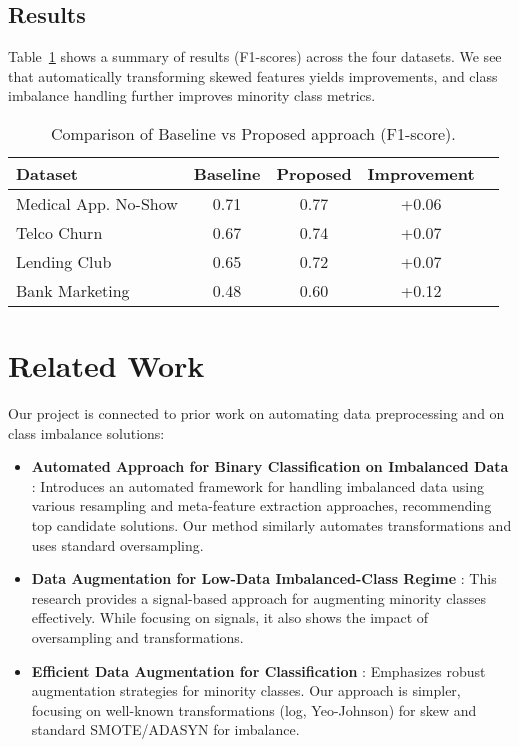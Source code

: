 \documentclass[11pt]{article}
\begin{document}
\subsection{Results}
Table~\ref{tab:results} shows a summary of results (F1-scores) across the four datasets. We see that automatically transforming skewed features yields improvements, and class imbalance handling further improves minority class metrics.

\begin{table}[H]
\centering
\caption{Comparison of Baseline vs Proposed approach (F1-score).}
\label{tab:results}
\begin{tabular}{lcccc}
\toprule
\textbf{Dataset} & \textbf{Baseline} & \textbf{Proposed} & \textbf{Improvement}\\
\midrule
Medical App. No-Show & 0.71 & 0.77 & +0.06 \\
Telco Churn & 0.67 & 0.74 & +0.07 \\
Lending Club & 0.65 & 0.72 & +0.07 \\
Bank Marketing & 0.48 & 0.60 & +0.12 \\
\bottomrule
\end{tabular}
\end{table}

\section{Related Work}
\label{sec:related}
Our project is connected to prior work on automating data preprocessing and on class imbalance solutions:

\begin{itemize}
    \item \textbf{Automated Approach for Binary Classification on Imbalanced Data} \cite{AutomatedImbal}:
    Introduces an automated framework for handling imbalanced data using various resampling and meta-feature extraction approaches, recommending top candidate solutions. Our method similarly automates transformations and uses standard oversampling.
    \item \textbf{Data Augmentation for Low-Data Imbalanced-Class Regime} \cite{sigaugment}:
    This research provides a signal-based approach for augmenting minority classes effectively. While focusing on signals, it also shows the impact of oversampling and transformations.
    \item \textbf{Efficient Data Augmentation for Classification} \cite{article3}:
    Emphasizes robust augmentation strategies for minority classes. Our approach is simpler, focusing on well-known transformations (log, Yeo-Johnson) for skew and standard SMOTE/ADASYN for imbalance.
\end{itemize}
\end{document}
